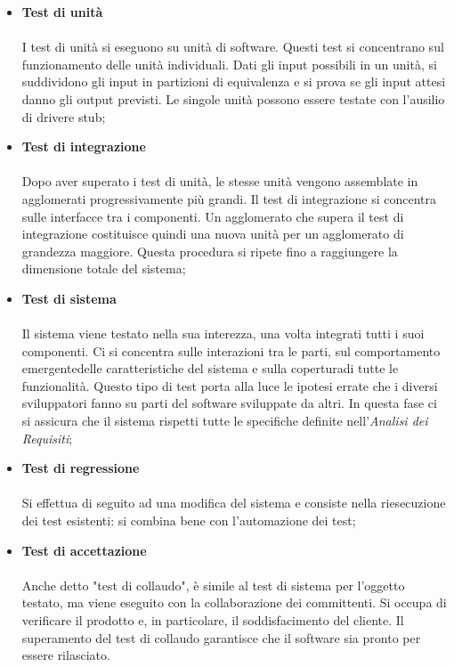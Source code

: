 		 \newline \newline
		\begin{itemize}
			\item \textbf{Test di unità} \mbox{}\\ \mbox{}\\
			I test di unità si eseguono su unità di software. Questi test si concentrano sul funzionamento delle unità individuali. Dati gli input possibili in un unità, si suddividono gli input in partizioni di equivalenza e si prova se gli input attesi danno gli output previsti. Le singole unità possono essere testate con l'ausilio di driver\glosp e stub\glosp ; \newline \newline
			\item \textbf{Test di integrazione} \mbox{}\\ \mbox{}\\
			Dopo aver superato i test di unità, le stesse unità vengono assemblate in agglomerati progressivamente più grandi. Il test di integrazione si concentra sulle interfacce tra i componenti. Un agglomerato che supera il test di integrazione costituisce quindi una nuova unità per un agglomerato di grandezza maggiore. Questa procedura si ripete fino a raggiungere la dimensione totale del sistema; \newline \newline
			\item \textbf{Test di sistema} \mbox{}\\ \mbox{}\\
			Il sistema viene testato nella sua interezza, una volta integrati tutti i suoi componenti. Ci si concentra sulle interazioni tra le parti, sul comportamento emergente\glosp delle caratteristiche del sistema e sulla copertura\glosp di tutte le funzionalità. Questo tipo di test porta alla luce le ipotesi errate che i diversi sviluppatori fanno su parti del software sviluppate da altri.
			In questa fase ci si assicura che il sistema rispetti tutte le specifiche definite nell'\textit{Analisi dei Requisiti}; \newline \newline
			\item \textbf{Test di regressione} \mbox{}\\ \mbox{}\\
			Si effettua di seguito ad una modifica del sistema e consiste nella riesecuzione dei test esistenti: si combina bene con l'automazione dei test; \newline \newline
			\item \textbf{Test di accettazione} \mbox{}\\ \mbox{}\\
			Anche detto "test di collaudo", è simile al test di sistema per l'oggetto testato, ma viene eseguito con la collaborazione dei committenti. Si occupa di verificare il prodotto e, in particolare, il soddisfacimento del cliente. Il superamento del test di collaudo garantisce che il software sia pronto per essere rilasciato.
			\end{itemize}
